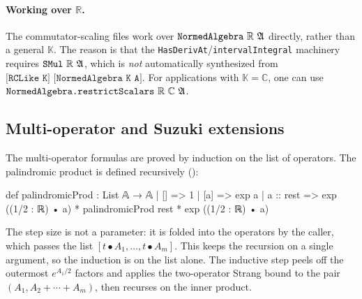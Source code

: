 \paragraph{Working over $\mathbb{R}$.}
The commutator-scaling files work over $\texttt{NormedAlgebra}\ \mathbb{R}\ \mathfrak{A}$
directly, rather than a general $\mathbb{K}$. The reason is that the
\texttt{HasDerivAt}/\texttt{intervalIntegral} machinery requires
$\texttt{SMul}\ \mathbb{R}\ \mathfrak{A}$, which is \emph{not} automatically synthesized
from $\texttt{[RCLike K] [NormedAlgebra K A]}$. For applications with
$\mathbb{K} = \mathbb{C}$, one can use
$\texttt{NormedAlgebra.restrictScalars}\ \mathbb{R}\ \mathbb{C}\ \A$.

\subsection{Multi-operator and Suzuki extensions}
\label{sec:lean-extensions}

The multi-operator formulas are proved by induction on the list of operators.
The palindromic product is defined recursively
():

\begin{leancode}
def palindromicProd : List 𝔸 → 𝔸
  | [] => 1
  | [a] => exp a
  | a :: rest =>
    exp ((1/2 : ℝ) • a) *
    palindromicProd rest *
    exp ((1/2 : ℝ) • a)
\end{leancode}

The step size is not a parameter: it is folded into the operators by the
caller, which passes the list $[t \bullet A_1, \ldots, t \bullet A_m]$. This
keeps the recursion on a single argument, so the induction is on the list
alone. The inductive step peels off the outermost $e^{A_1/2}$ factors and
applies the two-operator Strang bound to the pair
$(A_1, A_2 + \cdots + A_m)$, then recurses on the inner product.
